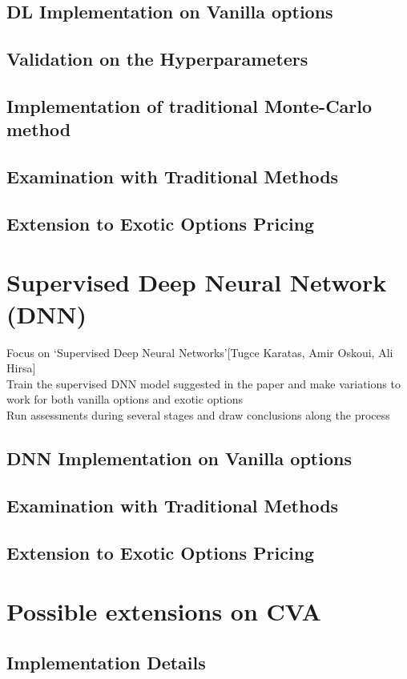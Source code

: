 \documentclass{report}
\begin{document}
\subsection{DL Implementation on Vanilla options}
\subsection{Validation on the Hyperparameters}
\subsection{Implementation of  traditional Monte-Carlo method}
\subsection{Examination with Traditional Methods}
\subsection{Extension to Exotic Options Pricing}

\section{Supervised Deep Neural Network (DNN)}
Focus on ‘Supervised Deep Neural Networks’[Tugce Karatas, Amir Oskoui, Ali Hirsa]\\
Train the supervised DNN model suggested in the paper and make variations to work for both vanilla options and exotic options\\
Run assessments during several stages and draw conclusions along the process

\subsection{DNN Implementation on Vanilla options}
\subsection{Examination with Traditional Methods}
\subsection{Extension to Exotic Options Pricing}

\section{Possible extensions on CVA}
\subsection{Implementation Details}
\end{document}
